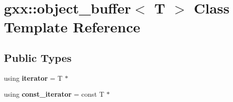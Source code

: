 \hypertarget{classgxx_1_1object__buffer}{}\section{gxx\+:\+:object\+\_\+buffer$<$ T $>$ Class Template Reference}
\label{classgxx_1_1object__buffer}
\subsection*{Public Types}
\begin{DoxyCompactItemize}
\item 
using {\bfseries iterator} = T $\ast$\hypertarget{classgxx_1_1object__buffer_a33604e35109227d1111647020a9de163}{}\label{classgxx_1_1object__buffer_a33604e35109227d1111647020a9de163}

\item 
using {\bfseries const\+\_\+iterator} = const T $\ast$\hypertarget{classgxx_1_1object__buffer_a1c8dcf423affdbf944048e97fd4f3e9a}{}\label{classgxx_1_1object__buffer_a1c8dcf423affdbf944048e97fd4f3e9a}

\end{DoxyCompactItemize}
